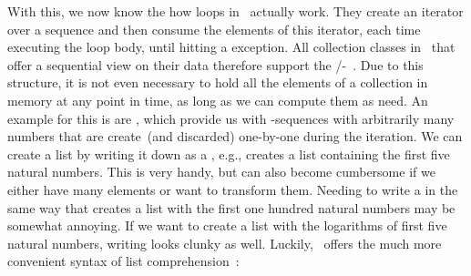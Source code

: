 With this, we now know the how  loops in \python\ actually work.
They create an iterator over a sequence and then consume the elements of this iterator, each time executing the loop body, until hitting a  exception.
All collection classes in \python\ that offer a sequential view on their data therefore support the /-~\cite{PEP234}.
Due to this  structure, it is not even necessary to hold all the elements of a collection in memory at any point in time, as long as we can compute them as need.
An example for this is are , which provide us with -sequences with arbitrarily many numbers that are create~(and discarded) one-by-one during the iteration.%
%
\endhsection%
%
%
\label{sec:listComprehension}%
%
We can create a list by writing it down as a , e.g., \pythonil{[1, 2, 3, 4, 5]} creates a list containing the first five natural numbers.
This is very handy, but can also become cumbersome if we either have many elements or want to transform them.
Needing to write a  in the same way that creates a list with the first one hundred natural numbers may be somewhat annoying.
If we want to create a list with the logarithms of first five natural numbers, writing  looks clunky as well.
Luckily, \python\ offers the much more convenient syntax of list comprehension~\cite{PEP202}:%
%
%
%
%
%
%
%
%
%
